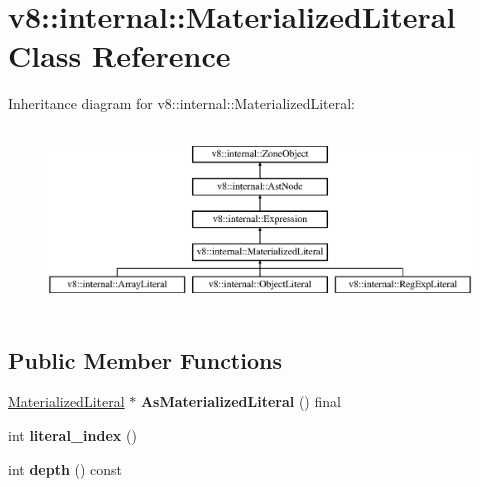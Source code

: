 \hypertarget{classv8_1_1internal_1_1_materialized_literal}{}\section{v8\+:\+:internal\+:\+:Materialized\+Literal Class Reference}
\label{classv8_1_1internal_1_1_materialized_literal}
Inheritance diagram for v8\+:\+:internal\+:\+:Materialized\+Literal\+:\begin{figure}[H]
\begin{center}
\leavevmode
\includegraphics[height=4.861111cm]{classv8_1_1internal_1_1_materialized_literal}
\end{center}
\end{figure}
\subsection*{Public Member Functions}
\begin{DoxyCompactItemize}
\item 
\hyperlink{classv8_1_1internal_1_1_materialized_literal}{Materialized\+Literal} $\ast$ {\bfseries As\+Materialized\+Literal} () final\hypertarget{classv8_1_1internal_1_1_materialized_literal_af4330214180953d8a641cd0d6c7a0612}{}\label{classv8_1_1internal_1_1_materialized_literal_af4330214180953d8a641cd0d6c7a0612}

\item 
int {\bfseries literal\+\_\+index} ()\hypertarget{classv8_1_1internal_1_1_materialized_literal_a4d00be1f53f49592300d1d6218c21fa3}{}\label{classv8_1_1internal_1_1_materialized_literal_a4d00be1f53f49592300d1d6218c21fa3}

\item 
int {\bfseries depth} () const \hypertarget{classv8_1_1internal_1_1_materialized_literal_a12d60c7878e436d4279987394a6ffa2c}{}\label{classv8_1_1internal_1_1_materialized_literal_a12d60c7878e436d4279987394a6ffa2c}

\end{DoxyCompactItemize}
